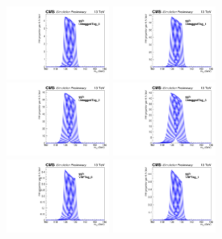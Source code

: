 \begin{figure}[ht!]
\centering
\includegraphics[width=0.3\textwidth]{modellingFigures/DCBpG/ggh_UntaggedTag_0_fmc_interp.pdf} 
\includegraphics[width=0.3\textwidth]{modellingFigures/DCBpG/ggh_UntaggedTag_1_fmc_interp.pdf} \\ 
\includegraphics[width=0.3\textwidth]{modellingFigures/DCBpG/ggh_UntaggedTag_2_fmc_interp.pdf} 
\includegraphics[width=0.3\textwidth]{modellingFigures/DCBpG/ggh_UntaggedTag_3_fmc_interp.pdf} \\
\includegraphics[width=0.3\textwidth]{modellingFigures/DCBpG/ggh_VBFTag_0_fmc_interp.pdf} 
\includegraphics[width=0.3\textwidth]{modellingFigures/DCBpG/ggh_VBFTag_1_fmc_interp.pdf} 

\end{figure}
